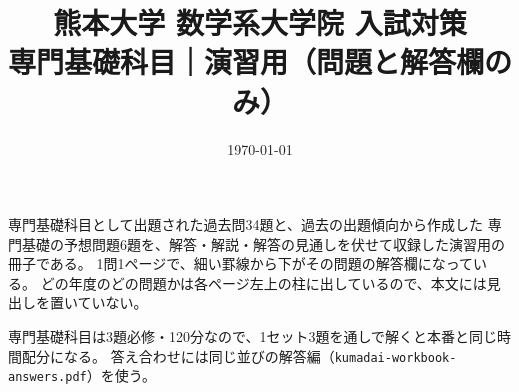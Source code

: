 \documentclass[uplatex, dvipdfmx]{jsreport}
\title{熊本大学 数学系大学院 入試対策\\{\Large 専門基礎科目｜演習用（問題と解答欄のみ）}}
\author{}
\date{\today}
\begin{document}
\maketitle

\begin{memo*}
専門基礎科目として出題された過去問34題と、過去の出題傾向から作成した
専門基礎の予想問題6題を、解答・解説・解答の見通しを伏せて収録した演習用の冊子である。
1問1ページで、細い罫線から下がその問題の解答欄になっている。
どの年度のどの問題かは各ページ左上の柱に出しているので、本文には見出しを置いていない。

専門基礎科目は3題必修・120分なので、1セット3題を通しで解くと本番と同じ時間配分になる。
答え合わせには同じ並びの解答編（\texttt{kumadai-workbook-answers.pdf}）を使う。
\end{memo*}

\tableofcontents








\end{document}

